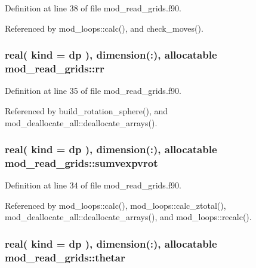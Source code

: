 Definition at line 38 of file mod\+\_\+read\+\_\+grids.\+f90.



Referenced by mod\+\_\+loops\+::calc(), and check\+\_\+moves().

\subsubsection[{\texorpdfstring{rr}{rr}}]{\setlength{\rightskip}{0pt plus 5cm}real( kind = dp ), dimension(\+:), allocatable mod\+\_\+read\+\_\+grids\+::rr}\hypertarget{namespacemod__read__grids_a668db35acd10bd5a0c686c3ea19da6c2}{}\label{namespacemod__read__grids_a668db35acd10bd5a0c686c3ea19da6c2}


Definition at line 35 of file mod\+\_\+read\+\_\+grids.\+f90.



Referenced by build\+\_\+rotation\+\_\+sphere(), and mod\+\_\+deallocate\+\_\+all\+::deallocate\+\_\+arrays().

\subsubsection[{\texorpdfstring{sumvexpvrot}{sumvexpvrot}}]{\setlength{\rightskip}{0pt plus 5cm}real( kind = dp ), dimension(\+:), allocatable mod\+\_\+read\+\_\+grids\+::sumvexpvrot}\hypertarget{namespacemod__read__grids_aff025afae6b2b208286c65a85cd8f82a}{}\label{namespacemod__read__grids_aff025afae6b2b208286c65a85cd8f82a}


Definition at line 34 of file mod\+\_\+read\+\_\+grids.\+f90.



Referenced by mod\+\_\+loops\+::calc(), mod\+\_\+loops\+::calc\+\_\+ztotal(), mod\+\_\+deallocate\+\_\+all\+::deallocate\+\_\+arrays(), and mod\+\_\+loops\+::recalc().

\subsubsection[{\texorpdfstring{thetar}{thetar}}]{\setlength{\rightskip}{0pt plus 5cm}real( kind = dp ), dimension(\+:), allocatable mod\+\_\+read\+\_\+grids\+::thetar}\hypertarget{namespacemod__read__grids_a40918dc75ea77a2757ea8d8dd43beb9e}{}\label{namespacemod__read__grids_a40918dc75ea77a2757ea8d8dd43beb9e}


